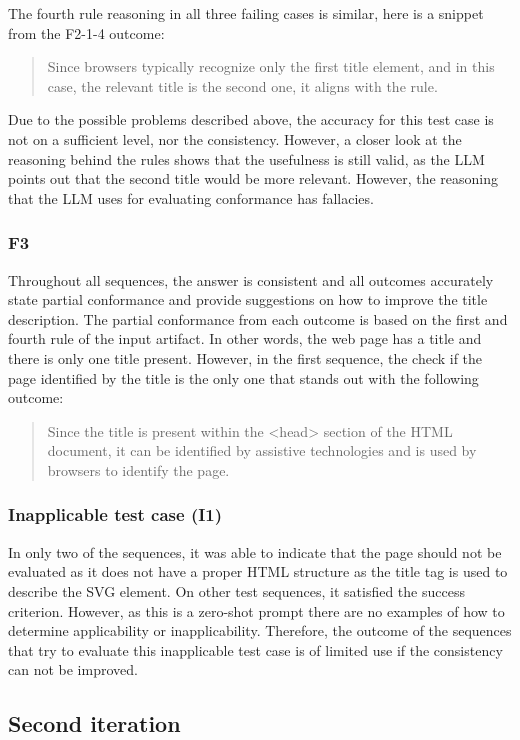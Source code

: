 The fourth rule reasoning in all three failing cases is similar, here is a snippet from the F2-1-4 outcome: \blockquote{Since browsers typically recognize only the first title element, and in this case, the relevant title is the second one, it aligns with the rule.}

Due to the possible problems described above, the accuracy for this test case is not on a sufficient level, nor the consistency. However, a closer look at the reasoning behind the rules shows that the usefulness is still valid, as the LLM points out that the second title would be more relevant. However, the reasoning that the LLM uses for evaluating conformance has fallacies.

\subsubsection{F3}

Throughout all sequences, the answer is consistent and all outcomes accurately state partial conformance and provide suggestions on how to improve the title description. The partial conformance from each outcome is based on the first and fourth rule of the input artifact. In other words, the web page has a title and there is only one title present. However, in the first sequence, the check if the page identified by the title is the only one that stands out with the following outcome: \blockquote{Since the title is present within the <head> section of the HTML document, it can be identified by assistive technologies and is used by browsers to identify the page.}

\subsubsection{Inapplicable test case (I1)}

In only two of the sequences, it was able to indicate that the page should not be evaluated as it does not have a proper HTML structure as the title tag is used to describe the SVG element. On other test sequences, it satisfied the success criterion. However, as this is a zero-shot prompt there are no examples of how to determine applicability or inapplicability. Therefore, the outcome of the sequences that try to evaluate this inapplicable test case is of limited use if the consistency can not be improved.

\subsection{Second iteration}

